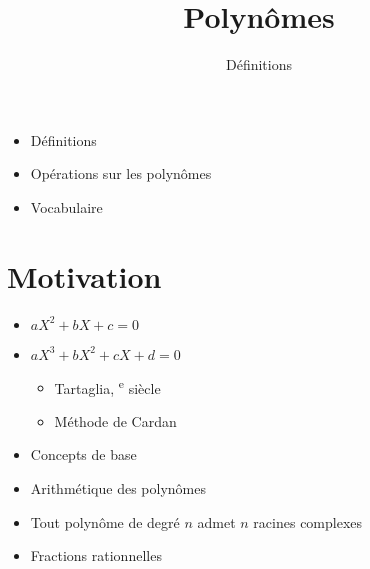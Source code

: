 






\title{{\bf Polynômes}}
\subtitle{Définitions}

\begin{frame}
  
  \debutmontitre

  \pause

{\footnotesize
\hfill
{}
\begin{minipage}{0.6\textwidth}
  \begin{itemize}
    \item<3-> Définitions
    \item<4-> Opérations sur les polynômes
    \item<5-> Vocabulaire
  \end{itemize}
\end{minipage}
}

\end{frame}

\setcounter{framenumber}{0}




\section*{Motivation}


\begin{frame}

\begin{itemize}
  \item $aX^2+bX+c=0$
\pause
  \item $aX^3+bX^2+cX+d=0$
\pause
  \begin{itemize}
    \item Tartaglia, \textsc{}\textsuperscript{e} siècle
\pause
    \item \og Méthode de Cardan\fg
  \end{itemize}
\end{itemize}

\bigskip 
\pause

\begin{itemize}
  \item Concepts de base

  \item Arithmétique des polynômes

  \item \og Tout polynôme de degré $n$ admet $n$ racines complexes \fg

  \item Fractions rationnelles
\end{itemize}

\end{frame}


